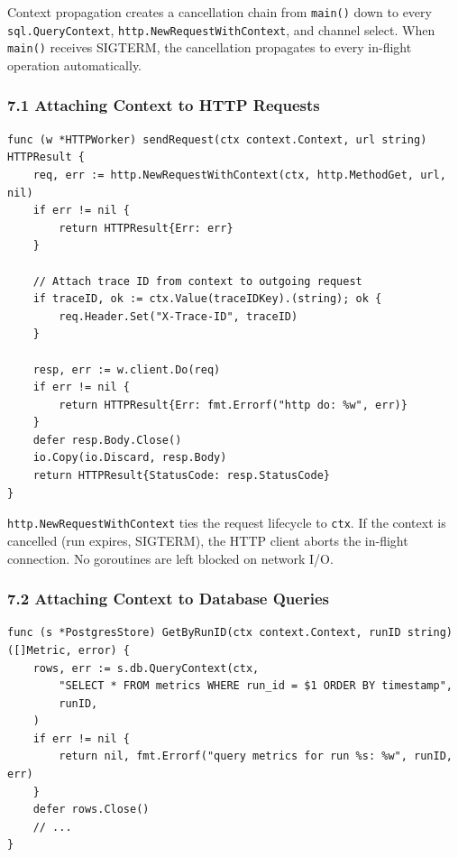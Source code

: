 \documentclass[11pt,a4paper,oneside]{book}
\begin{document}
Context propagation creates a cancellation chain from \texttt{main()}
down to every \texttt{sql.QueryContext},
\texttt{http.NewRequestWithContext}, and channel select. When
\texttt{main()} receives SIGTERM, the cancellation propagates to every
in-flight operation automatically.

\subsubsection{7.1 Attaching Context to HTTP
Requests}

\begin{verbatim}
func (w *HTTPWorker) sendRequest(ctx context.Context, url string) HTTPResult {
    req, err := http.NewRequestWithContext(ctx, http.MethodGet, url, nil)
    if err != nil {
        return HTTPResult{Err: err}
    }

    // Attach trace ID from context to outgoing request
    if traceID, ok := ctx.Value(traceIDKey).(string); ok {
        req.Header.Set("X-Trace-ID", traceID)
    }

    resp, err := w.client.Do(req)
    if err != nil {
        return HTTPResult{Err: fmt.Errorf("http do: %w", err)}
    }
    defer resp.Body.Close()
    io.Copy(io.Discard, resp.Body)
    return HTTPResult{StatusCode: resp.StatusCode}
}
\end{verbatim}

\texttt{http.NewRequestWithContext} ties the request lifecycle to
\texttt{ctx}. If the context is cancelled (run expires, SIGTERM), the
HTTP client aborts the in-flight connection. No goroutines are left
blocked on network I/O.

\subsubsection{7.2 Attaching Context to Database
Queries}

\begin{verbatim}
func (s *PostgresStore) GetByRunID(ctx context.Context, runID string) ([]Metric, error) {
    rows, err := s.db.QueryContext(ctx,
        "SELECT * FROM metrics WHERE run_id = $1 ORDER BY timestamp",
        runID,
    )
    if err != nil {
        return nil, fmt.Errorf("query metrics for run %s: %w", runID, err)
    }
    defer rows.Close()
    // ...
}
\end{verbatim}
\end{document}
